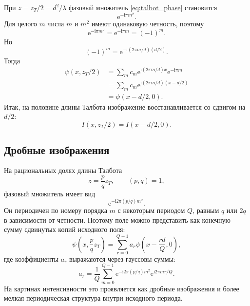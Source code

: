 \documentclass[12pt,a4paper]{article}
\newcommand{\ii}{\mathrm{i}}
\newcommand{\e}{\mathrm{e}}
\begin{document}
При $z=z_T/2=d^2/\lambda$ фазовый множитель \eqref{eq:talbot_phase} становится
\begin{equation}
    \e^{-\ii\pi m^2}.
\end{equation}
Для целого $m$ числа $m$ и $m^2$ имеют одинаковую четность, поэтому
\begin{equation}
    \e^{-\ii\pi m^2}=\e^{-\ii\pi m}=(-1)^m.
\end{equation}
Но
\begin{equation}
    (-1)^m=\e^{-\ii(2\pi m/d)(d/2)}.
\end{equation}
Тогда
\begin{align}
    \psi(x,z_T/2)
    &=
    \sum_m c_m
    \e^{\ii(2\pi m/d)x}
    \e^{-\ii\pi m}\\
    &=
    \sum_m c_m
    \e^{\ii(2\pi m/d)(x-d/2)}\\
    &=\psi(x-d/2,0).
\end{align}
Итак, на половине длины Талбота изображение восстанавливается со сдвигом на $d/2$:
\begin{equation}
    I(x,z_T/2)=I(x-d/2,0).
\end{equation}

\subsection{Дробные изображения}

На рациональных долях длины Талбота
\begin{equation}
    z=\frac{p}{q}z_T,\qquad (p,q)=1,
\end{equation}
фазовый множитель имеет вид
\begin{equation}
    \e^{-\ii 2\pi(p/q)m^2}.
\end{equation}
Он периодичен по номеру порядка $m$ с некоторым периодом $Q$, равным $q$ или $2q$ в зависимости от четности. Поэтому поле можно представить как конечную сумму сдвинутых копий исходного поля:
\begin{equation}
    \psi\left(x,\frac{p}{q}z_T\right)
    =
    \sum_{r=0}^{Q-1} a_r
    \psi\left(x-\frac{rd}{Q},0\right),
\end{equation}
где коэффициенты $a_r$ выражаются через гауссовы суммы:
\begin{equation}
    a_r=
    \frac{1}{Q}
    \sum_{m=0}^{Q-1}
    \e^{-\ii 2\pi(p/q)m^2}
    \e^{\ii 2\pi mr/Q}.
\end{equation}
На картинах интенсивности это проявляется как дробные изображения и более мелкая периодическая структура внутри исходного периода.
\end{document}
